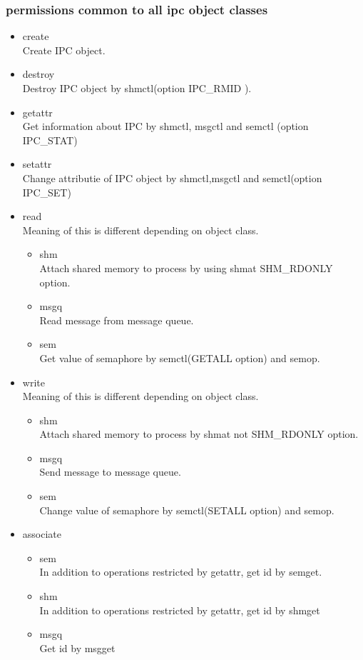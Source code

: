 \documentclass{article}
\begin{document}
\subsubsection{permissions common to all ipc object classes}
\begin{itemize}
 \item create\\
       Create IPC object.
 \item destroy\\
       Destroy IPC object by shmctl(option IPC\_RMID ).
 \item getattr\\
       Get information about IPC by shmctl, msgctl and semctl (option IPC\_STAT) 
 \item setattr\\
       Change attributie of IPC object by shmctl,msgctl and
       semctl(option IPC\_SET)
 \item read\\
       Meaning of this is different depending on object class.
       \begin{itemize}
	\item shm\\
	      Attach shared memory to process by using shmat SHM\_RDONLY option.
	\item msgq\\
	      Read message from message queue.
	\item sem\\
	      Get value of semaphore by semctl(GETALL option) and semop.
       \end{itemize}
       
 \item write\\
       Meaning of this is different depending on object class.
       \begin{itemize}
	\item shm\\
	      Attach shared memory to process by shmat not SHM\_RDONLY option.
	\item msgq\\
	      Send message to message queue.
	\item sem\\
	      Change value of semaphore by semctl(SETALL option) and semop.
       \end{itemize}
       
 \item associate\\
       \begin{itemize}
	\item sem\\
	      In addition to operations restricted by getattr, get id by
	      semget.
	\item shm\\
	      In addition to operations restricted by getattr, get id by shmget
	\item msgq\\
	      Get id by msgget
       \end{itemize}


\end{itemize}
\end{document}
